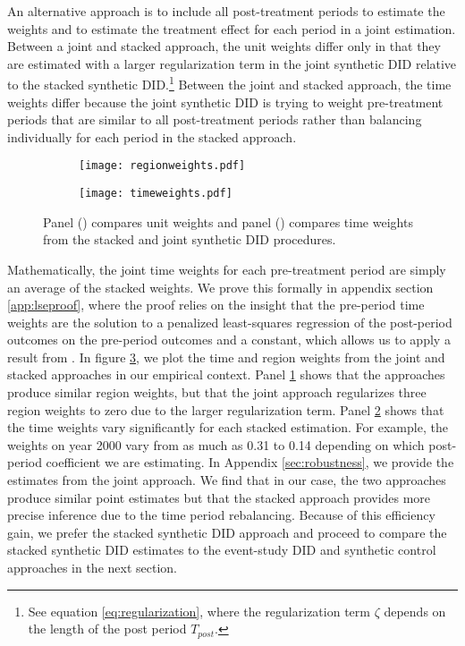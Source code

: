 \documentclass[12pt]{article}
\begin{document}
An alternative approach is to include all post-treatment periods to estimate the weights and to estimate the treatment effect for each period in a joint estimation.  Between a joint and stacked approach, the unit weights differ only in that they are estimated with a larger regularization term in the joint synthetic DID relative to the stacked synthetic DID.\footnote{See equation \ref{eq:regularization}, where the regularization term \(\zeta\) depends on the length of the post period \(T_{post}\).}  Between the joint and stacked approach, the time weights differ because the joint synthetic DID is trying to weight pre-treatment periods that are similar to all post-treatment periods rather than balancing individually for each period in the stacked approach.  

\begin{figure}
\centering
\begin{subfigure}[t]{.49\textwidth}
    \centering
    \vspace{0pt}
     \texttt{[image: regionweights.pdf]}
        \caption{}\label{fig:regionweights}
\end{subfigure}
    \begin{subfigure}[t]{.49\textwidth}
    \centering
    \vspace{0pt}
     \texttt{[image: timeweights.pdf]}
        \caption{}\label{fig:timeweights}
\end{subfigure}
    \caption{Panel () compares unit weights and panel () compares time weights from the stacked and joint synthetic DID procedures.} \label{fig:stackedjointcomparison}
\end{figure}

Mathematically, the joint time weights for each pre-treatment period are simply an average of the stacked weights.  We prove this formally in appendix section \ref{app:lseproof}, where the proof relies on the insight that the pre-period time weights are the solution to a penalized least-squares regression of the post-period outcomes on the pre-period outcomes and a constant, which allows us to apply a result from \cite{lawson1995}.  In figure \ref{fig:stackedjointcomparison}, we plot the time and region weights from the joint and stacked approaches in our empirical context.  Panel \ref{fig:regionweights} shows that the approaches produce similar region weights, but that the joint approach regularizes three region weights to zero due to the larger regularization term.  Panel \ref{fig:timeweights} shows that the time weights vary significantly for each stacked estimation.  For example, the weights on year 2000 vary from as much as 0.31 to 0.14 depending on which post-period coefficient we are estimating.  In Appendix \ref{sec:robustness}, we provide the estimates from the joint approach. We find that in our case, the two approaches produce similar point estimates but that the stacked approach provides more precise inference due to the time period rebalancing.  Because of this efficiency gain, we prefer the stacked synthetic DID approach and proceed to compare the stacked synthetic DID estimates to the event-study DID and synthetic control approaches in the next section.
\end{document}
